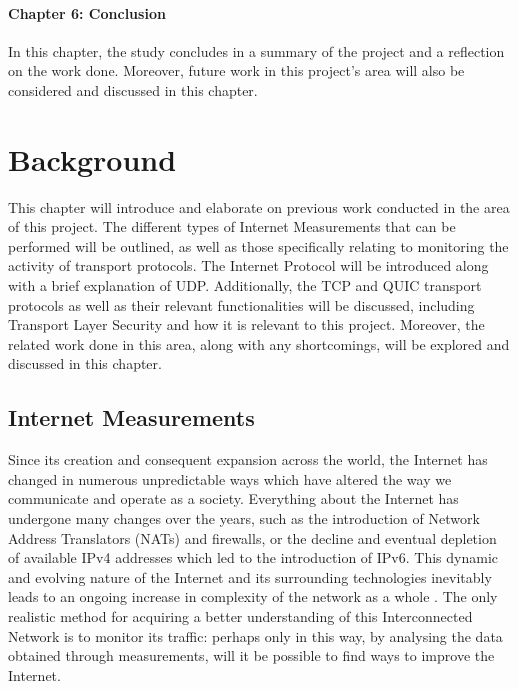 \documentclass{l4proj}
\begin{document}
\subsubsection{Chapter 6: Conclusion} In this chapter, the study concludes in a summary of the project and a reflection on the work done. Moreover, future work in this project's area will also be considered and discussed in this chapter.


\chapter{Background}

This chapter will introduce and elaborate on previous work conducted in the area of this project. The different types of Internet Measurements that can be performed will be outlined, as well as those specifically relating to monitoring the activity of transport protocols. The Internet Protocol will be introduced along with a brief explanation of UDP. Additionally, the TCP and QUIC transport protocols as well as their relevant functionalities will be discussed, including Transport Layer Security and how it is relevant to this project. Moreover, the related work done in this area, along with any shortcomings, will be explored and discussed in this chapter.


\section{Internet Measurements}

Since its creation and consequent expansion across the world, the Internet has changed in numerous unpredictable ways which have altered the way we communicate and operate as a society. Everything about the Internet has undergone many changes over the years, such as the introduction of Network Address Translators (NATs) and firewalls, or the decline and eventual depletion of available IPv4 addresses which led to the introduction of IPv6. This dynamic and evolving nature of the Internet and its surrounding technologies inevitably leads to an ongoing increase in complexity of the network as a whole \citep{John2010}. The only realistic method for acquiring a better understanding of this Interconnected Network is to monitor its traffic: perhaps only in this way, by analysing the data obtained through measurements, will it be possible to find ways to improve the Internet. 
\end{document}
